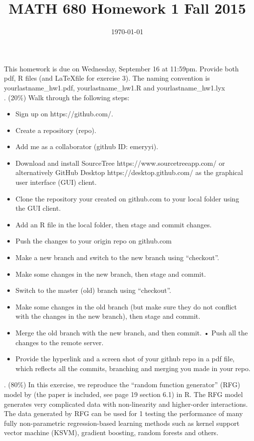 \documentclass{article}
\title{MATH 680 Homework 1 Fall 2015}
\date{\today}
\begin{document}
\maketitle

This homework is due on Wednesday, September 16 at 11:59pm. Provide both pdf, R
files (and \LaTeX file for exercise 3). The naming convention is 
yourlastname\_hw1.pdf, yourlastname\_hw1.R and yourlastname\_hw1.lyx \\


. (20\%) Walk through the following steps:
\begin{itemize}
\item Sign up on https://github.com/.
\item Create a repository (repo).
\item Add me as a collaborator (github ID: emeryyi).
\item Download and install SourceTree https://www.sourcetreeapp.com/ or
  alternatively GitHub Desktop https://desktop.github.com/ as the graphical user
  interface (GUI) client. 
\item Clone the repository your created on github.com to your local folder using the GUI client.
\item Add an R file in the local folder, then stage and commit changes.
\item Push the changes to your origin repo on github.com
\item Make a new branch and switch to the new branch using “checkout”.
\item Make some changes in the new branch, then stage and commit.
\item Switch to the master (old) branch using “checkout”.
\item Make some changes in the old branch (but make sure they do not conflict with the changes in the new branch), then stage and commit.
\item Merge the old branch with the new branch, and then commit.
• Push all the changes to the remote server.
\item Provide the hyperlink and a screen shot of your github repo in a pdf file, which reflects all the commits, branching and merging you made in your repo.
\end{itemize}


. (80\%) In this exercise, we reproduce the “random function generator” (RFG) model by \cite{friedman2001greedy} (the paper is included, see page 19 section 6.1) in R. The RFG model generates very complicated data with non-linearity and higher-order interactions. The data generated by RFG can be used for 
1 testing the performance of many fully non-parametric regression-based learning methods such as kernel support vector machine (KSVM), gradient boosting, random forests and others.
\end{document}
